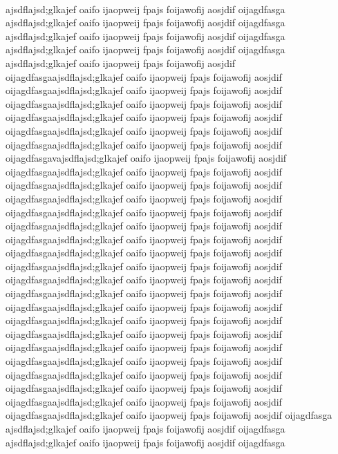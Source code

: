 \documentclass[twoside,a4paper,twocolumn,landscape]{PhanRaw}
\begin{document}
\\
ajsdflajsd;glkajef oaifo ijaopweij fpajs foijawofij aosjdif oijagdfasga
\\
ajsdflajsd;glkajef oaifo ijaopweij fpajs foijawofij aosjdif oijagdfasga\\
ajsdflajsd;glkajef oaifo ijaopweij fpajs foijawofij aosjdif oijagdfasga
\\
ajsdflajsd;glkajef oaifo ijaopweij fpajs foijawofij aosjdif oijagdfasga
ajsdflajsd;glkajef oaifo ijaopweij fpajs foijawofij aosjdif oijagdfasgaajsdflajsd;glkajef oaifo ijaopweij fpajs foijawofij aosjdif oijagdfasgaajsdflajsd;glkajef oaifo ijaopweij fpajs foijawofij aosjdif oijagdfasgaajsdflajsd;glkajef oaifo ijaopweij fpajs foijawofij aosjdif oijagdfasgaajsdflajsd;glkajef oaifo ijaopweij fpajs foijawofij aosjdif oijagdfasgaajsdflajsd;glkajef oaifo ijaopweij fpajs foijawofij aosjdif oijagdfasgaajsdflajsd;glkajef oaifo ijaopweij fpajs foijawofij aosjdif oijagdfasgavajsdflajsd;glkajef oaifo ijaopweij fpajs foijawofij aosjdif oijagdfasgaajsdflajsd;glkajef oaifo ijaopweij fpajs foijawofij aosjdif oijagdfasgaajsdflajsd;glkajef oaifo ijaopweij fpajs foijawofij aosjdif oijagdfasgaajsdflajsd;glkajef oaifo ijaopweij fpajs foijawofij aosjdif oijagdfasgaajsdflajsd;glkajef oaifo ijaopweij fpajs foijawofij aosjdif oijagdfasgaajsdflajsd;glkajef oaifo ijaopweij fpajs foijawofij aosjdif oijagdfasgaajsdflajsd;glkajef oaifo ijaopweij fpajs foijawofij aosjdif oijagdfasgaajsdflajsd;glkajef oaifo ijaopweij fpajs foijawofij aosjdif oijagdfasgaajsdflajsd;glkajef oaifo ijaopweij fpajs foijawofij aosjdif oijagdfasgaajsdflajsd;glkajef oaifo ijaopweij fpajs foijawofij aosjdif oijagdfasgaajsdflajsd;glkajef oaifo ijaopweij fpajs foijawofij aosjdif oijagdfasgaajsdflajsd;glkajef oaifo ijaopweij fpajs foijawofij aosjdif oijagdfasgaajsdflajsd;glkajef oaifo ijaopweij fpajs foijawofij aosjdif oijagdfasgaajsdflajsd;glkajef oaifo ijaopweij fpajs foijawofij aosjdif oijagdfasgaajsdflajsd;glkajef oaifo ijaopweij fpajs foijawofij aosjdif oijagdfasgaajsdflajsd;glkajef oaifo ijaopweij fpajs foijawofij aosjdif oijagdfasgaajsdflajsd;glkajef oaifo ijaopweij fpajs foijawofij aosjdif oijagdfasgaajsdflajsd;glkajef oaifo ijaopweij fpajs foijawofij aosjdif oijagdfasgaajsdflajsd;glkajef oaifo ijaopweij fpajs foijawofij aosjdif oijagdfasgaajsdflajsd;glkajef oaifo ijaopweij fpajs foijawofij aosjdif oijagdfasga ajsdflajsd;glkajef oaifo ijaopweij fpajs foijawofij aosjdif oijagdfasga ajsdflajsd;glkajef oaifo ijaopweij fpajs foijawofij aosjdif oijagdfasga
\end{document}
